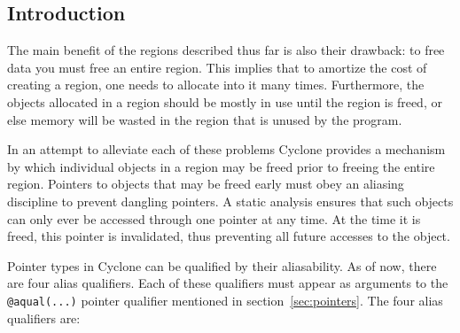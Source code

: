 \subsection{Introduction}

The main benefit of the regions described thus far is also their
drawback: to free data you must free an entire region.  This implies
that to amortize the cost of creating a region, one needs to allocate
into it many times.  Furthermore, the objects allocated in a region
should be mostly in use until the region is freed, or else memory will
be wasted in the region that is unused by the program.

In an attempt to alleviate each of these problems Cyclone provides a
mechanism by which individual objects in a region may be freed prior
to freeing the entire region. Pointers to objects that may be freed
early must obey an aliasing discipline to prevent dangling pointers. A
static analysis ensures that such objects can only ever be accessed
through one pointer at any time. At the time it is freed, this pointer
is invalidated, thus preventing all future accesses to the object.

Pointer types in Cyclone can be qualified by their aliasability. As of
now, there are four alias qualifiers. Each of these qualifiers must
appear as arguments to the {\tt @aqual(...)} pointer qualifier
mentioned in section~\ref{sec:pointers}. The four alias qualifiers are:

